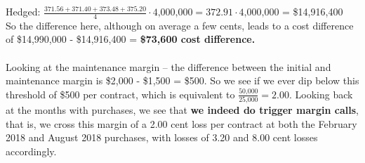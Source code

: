 \documentclass{article}
\begin{document}
{Hedged: \(\frac{371.56 + 371.40 + 373.48 + 375.20}{4} \cdot \text{4,000,000} = 372.91 \cdot \text{4,000,000} \) = \$14,916,400 \\
So the difference here, although on average a few cents, leads to a cost difference of \$14,990,000 - \$14,916,400 = \textbf{\$73,600 cost difference.} \\ \\
Looking at the maintenance margin -- the difference between the initial and maintenance margin is \$2,000 - \$1,500 = \$500. So we see if we ever dip below this threshold of \$500 per contract, which is equivalent to \(\frac{\text{50,000}}{\text{25,000}} = 2.00\). Looking back at the months with purchases, we see that \textbf{we indeed do trigger margin calls}, that is, we cross this margin of a 2.00 cent loss per contract at both the February 2018 and August 2018 purchases, with losses of 3.20 and 8.00 cent losses accordingly.

}
\end{document}
